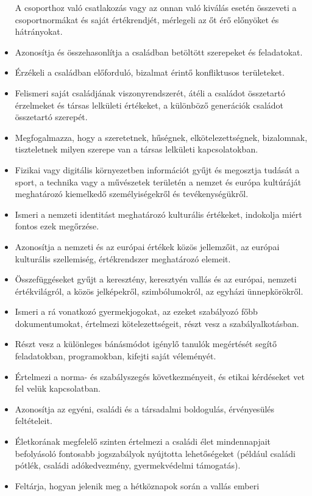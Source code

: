\begin{itemize}
  A csoporthoz való csatlakozás vagy az onnan való kiválás esetén
  összeveti a csoportnormákat és saját értékrendjét, mérlegeli az őt érő
  előnyöket és hátrányokat.
\item
  Azonosítja és összehasonlítja a családban betöltött szerepeket és
  feladatokat.
\item
  Érzékeli a családban előforduló, bizalmat érintő konfliktusos
  területeket.
\item
  Felismeri saját családjának viszonyrendszerét, átéli a családot
  összetartó érzelmeket és társas lelkületi értékeket, a különböző
  generációk családot összetartó szerepét.
\item
  Megfogalmazza, hogy a szeretetnek, hűségnek, elkötelezettségnek,
  bizalomnak, tiszteletnek milyen szerepe van a társas lelkületi
  kapcsolatokban.
\item
  Fizikai vagy digitális környezetben információt gyűjt és megosztja
  tudását a sport, a technika vagy a művészetek területén a nemzet és
  európa kultúráját meghatározó kiemelkedő személyiségekről és
  tevékenységükről.
\item
  Ismeri a nemzeti identitást meghatározó kulturális értékeket,
  indokolja miért fontos ezek megőrzése.
\item
  Azonosítja a nemzeti és az európai értékek közös jellemzőit, az
  európai kulturális szellemiség, értékrendszer meghatározó elemeit.
\item
  Összefüggéseket gyűjt a keresztény, keresztyén vallás és az európai,
  nemzeti értékvilágról, a közös jelképekről, szimbólumokról, az egyházi
  ünnepkörökről.
\item
  Ismeri a rá vonatkozó gyermekjogokat, az ezeket szabályozó főbb
  dokumentumokat, értelmezi kötelezettségeit, részt vesz a
  szabályalkotásban.
\item
  Részt vesz a különleges bánásmódot igénylő tanulók megértését segítő
  feladatokban, programokban, kifejti saját véleményét.
\item
  Értelmezi a norma- és szabályszegés következményeit, és etikai
  kérdéseket vet fel velük kapcsolatban.
\item
  Azonosítja az egyéni, családi és a társadalmi boldogulás, érvényesülés
  feltételeit.
\item
  Életkorának megfelelő szinten értelmezi a családi élet mindennapjait
  befolyásoló fontosabb jogszabályok nyújtotta lehetőségeket (például
  családi pótlék, családi adókedvezmény, gyermekvédelmi támogatás).
\item
  Feltárja, hogyan jelenik meg a hétköznapok során a vallás emberi

\end{itemize}
